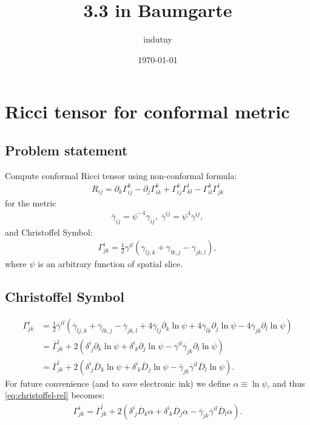 \documentclass[aps,prd,preprint]{revtex4-1}
\newcommand{\ogamma}{\overline{\gamma}}
\newcommand{\OGamma}{\overline{\Gamma}}
\newcommand{\OD}{\overline{D}}
\begin{document}
\title{3.3  in Baumgarte}
\author{indutny}
\date{\today}
\noaffiliation

\maketitle

\section{Ricci tensor for conformal metric}

\subsection{Problem statement}

Compute conformal Ricci tensor using non-conformal formula:
\begin{align}\label{eq:ricci}
R_{ij} = \partial_k \Gamma^k_{ij} - \partial_j \Gamma^k_{ik} + \Gamma^k_{ij} \Gamma^l_{kl} -
  \Gamma^k_{il} \Gamma^l_{jk}
\end{align}
for the metric
\begin{align}
\ogamma_{ij} = \psi^{-4} \gamma_{ij}, \; \ogamma^{ij} = \psi^{4} \gamma^{ij},
\end{align}
and Christoffel Symbol:
\begin{align}\label{eq:cristoffel}
\Gamma^i_{jk} = \frac{1}{2} \gamma^{il} \left( \gamma_{lj,k} + \gamma_{lk,j} - \gamma_{jk,l} \right),
\end{align}
where $\psi$ is an arbitrary function of spatial slice.

\subsection{Christoffel Symbol}

\begin{align}
\Gamma^{i}_{jk} & = \frac{1}{2} \ogamma^{il} \left(
  \ogamma_{lj,k} +
  \ogamma_{lk,j} -
  \ogamma_{jk,l} +
  4 \ogamma_{lj} \partial_k \ln \psi +
  4 \ogamma_{lk} \partial_j \ln \psi -
  4 \ogamma_{jk} \partial_l \ln \psi \right) \\
& = \OGamma^{i}_{jk} + 2 \left(
  \delta^{i}_{\; j} \partial_k \ln \psi + \delta^{i}_{\; k} \partial_j \ln \psi - \ogamma^{il} \ogamma_{jk} \partial_l \ln \psi
  \right) \\
& = \OGamma^{i}_{jk} + 2 \left(
  \delta^i_{\; j} \OD_k \ln \psi + \delta^i_{\; k} \OD_j \ln \psi - \ogamma_{jk} \ogamma^{il}  \OD_l \ln \psi \right).
\label{eq:christoffel-rel}
\end{align}
For future convenience (and to save electronic ink) we define $\alpha \equiv \ln \psi$, and thus
\eqref{eq:christoffel-rel} becomes:
\begin{align}
\Gamma^{i}_{jk} = \OGamma^{i}_{jk} + 2 \left(
  \delta^i_{\; j} \OD_k \alpha + \delta^i_{\; k} \OD_j \alpha - \ogamma_{jk} \ogamma^{il}  \OD_l \alpha \right).
\end{align}
\end{document}
